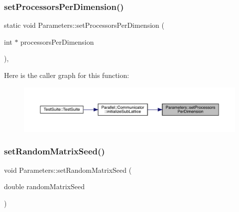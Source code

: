 \subsubsection{\texorpdfstring{setProcessorsPerDimension()}{setProcessorsPerDimension()}}
{\footnotesize\ttfamily static void Parameters\+::set\+Processors\+Per\+Dimension (\begin{DoxyParamCaption}\item[{int $\ast$}]{processors\+Per\+Dimension }\end{DoxyParamCaption})\hspace{0.3cm}{\ttfamily [inline]}, {\ttfamily [static]}}

Here is the caller graph for this function\+:\nopagebreak
\begin{figure}[H]
\begin{center}
\leavevmode
\includegraphics[width=350pt]{class_parameters_a4c983b1ab17ec51be118792b3a6d17a5_icgraph}
\end{center}
\end{figure}
\mbox{\label{class_parameters_a46615f8286bd7363ab1f09074fdc6940}} 
\subsubsection{\texorpdfstring{setRandomMatrixSeed()}{setRandomMatrixSeed()}}
{\footnotesize\ttfamily void Parameters\+::set\+Random\+Matrix\+Seed (\begin{DoxyParamCaption}\item[{double}]{random\+Matrix\+Seed }\end{DoxyParamCaption})\hspace{0.3cm}{\ttfamily [static]}}

